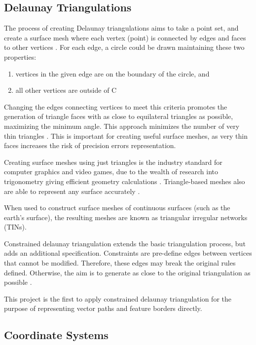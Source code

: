 \documentclass[12pt]{article}
\begin{document}
\subsection{Delaunay Triangulations}

The process of creating Delaunay triangulations aims to take a point set, and create a surface mesh where each vertex (point) is connected by edges and faces to other vertices \autocite{preparata2012computational}. For each edge, a circle could be drawn maintaining these two properties:

\begin{enumerate}[(1)]
  \item vertices in the given edge are on the boundary of the circle, and
  \item all other vertices are outside of C
\end{enumerate}

Changing the edges connecting vertices to meet this criteria promotes the generation of triangle faces with as close to equilateral triangles as possible, maximizing the minimum angle. This approach minimizes the number of very thin triangles \autocite{preparata2012computational}. This is important for creating useful surface meshes, as very thin faces increases the risk of precision errors  representation.

Creating surface meshes using just triangles is the industry standard for computer graphics and video games, due to the wealth of research into trigonometry giving efficient geometry calculations \autocite{marschner2018graphics}. Triangle-based meshes also are able to represent any surface accurately \autocite{perkins2013fielddstar}.

When used to construct surface meshes of continuous surfaces (such as the earth's surface), the resulting meshes are known as triangular irregular networks (TINs).


Constrained delaunay triangulation extends the basic triangulation process, but adds an additional specification. Constraints are pre-define edges between vertices that cannot be modified. Therefore, these edges may break the original rules defined. Otherwise, the aim is to generate as close to the original triangulation as possible \autocite{chew1987constraints}.

This project is the first to apply constrained delaunay triangulation for the purpose of representing vector paths and feature borders directly.

\subsection{Coordinate Systems}
\end{document}
